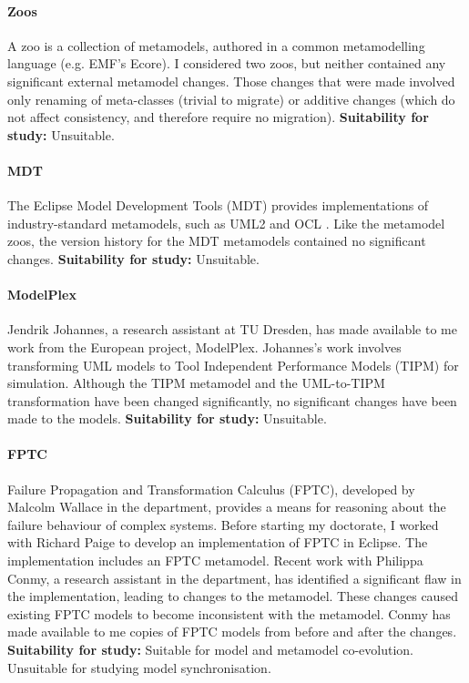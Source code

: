 \paragraph{Zoos} %
\label{par:zoos}
A zoo is a collection of metamodels, authored in a common metamodelling language (e.g. EMF's Ecore). I considered two zoos, but neither contained any significant external metamodel changes. Those changes that were made involved only renaming of meta-classes (trivial to migrate) or additive changes (which do not affect consistency, and therefore require no migration). \textbf{Suitability for study:} Unsuitable.

\paragraph{MDT} %
\label{par:mdt}
The Eclipse Model Development Tools (MDT) \cite{mdt} provides implementations of industry-standard metamodels, such as UML2 \cite{uml212} and OCL \cite{ocl2}. Like the metamodel zoos, the version history for the MDT metamodels contained no significant changes. \textbf{Suitability for study:} Unsuitable.

\paragraph{ModelPlex} %
\label{par:modelplex}
Jendrik Johannes, a research assistant at TU Dresden, has made available to me work from the European project, ModelPlex. Johannes's work involves transforming UML models to Tool Independent Performance Models (TIPM) for simulation. Although the TIPM metamodel and the UML-to-TIPM transformation have been changed significantly, no significant changes have been made to the models. \textbf{Suitability for study:} Unsuitable.

\paragraph{FPTC} %
\label{par:fptc}
Failure Propagation and Transformation Calculus (FPTC), developed by Malcolm Wallace in the department, provides a means for reasoning about the failure behaviour of complex systems. Before starting my doctorate, I worked with Richard Paige to develop an implementation of FPTC in Eclipse. The implementation includes an FPTC metamodel. Recent work with Philippa Conmy, a research assistant in the department, has identified a significant flaw in the implementation, leading to changes to the metamodel. These changes caused existing FPTC models to become inconsistent with the metamodel. Conmy has made available to me copies of FPTC models from before and after the changes. \textbf{Suitability for study:} Suitable for model and metamodel co-evolution. Unsuitable for studying model synchronisation.

